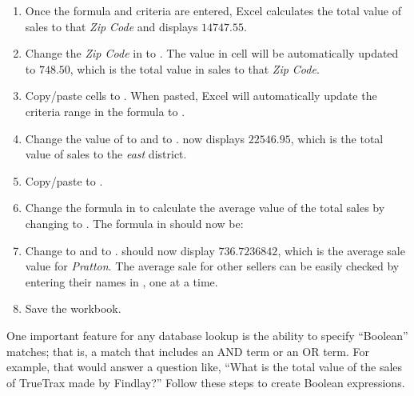 \begin{enumerate}[resume]
	\item Once the formula and criteria are entered, Excel calculates the total value of sales to that \textit{Zip Code} and displays $ 14747.55 $.
	\item Change the \textit{Zip Code} in  to . The value in cell  will be automatically updated to $ 748.50 $, which is the total value in sales to that \textit{Zip Code}.
	\item Copy/paste cells  to . When pasted, Excel will automatically update the criteria range in the formula to .
	\item Change the value of  to  and  to .  now displays $ 22546.95 $, which is the total value of sales to the \textit{east} district.
	\item Copy/paste  to .
	\item Change the formula in  to calculate the average value of the total sales by changing  to . The formula in  should now be: 
	\item Change  to  and  to .  should now display $ 736.7236842 $, which is the average sale value for \textit{Pratton}. The average sale for other sellers can be easily checked by entering their names in , one at a time.
	\item Save the  workbook.
\end{enumerate}

One important feature for any database lookup is the ability to specify ``Boolean'' matches; that is, a match that includes an AND term or an OR term. For example, that would answer a question like, ``What is the total value of the sales of TrueTrax made by Findlay?'' Follow these steps to create Boolean expressions.

